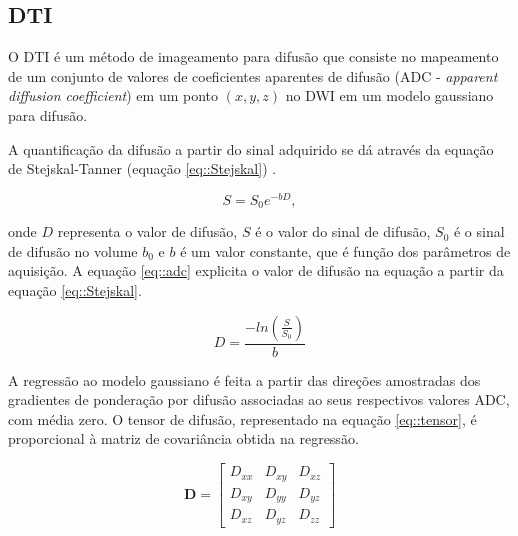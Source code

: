 \documentclass[
    12pt,                %
    oneside,            %
    a4paper,            %
    english,            %
    french,                %
    spanish,            %
    brazil                %
    ]{abntex2}
\begin{document}
\pagebreak
\subsection{DTI}
O DTI é um método de imageamento para difusão que consiste no mapeamento de um conjunto de valores de coeficientes aparentes de difusão (ADC - \textit{apparent diffusion coefficient}) em um ponto $(x, y, z)$ no DWI em um modelo gaussiano para difusão. 

A quantificação da difusão a partir do sinal adquirido se dá através da equação de Stejskal-Tanner (equação \ref{eq::Stejskal}) \cite{DTI_Handbook}.

\begin{equation}
    S = S_0 e^{-bD},
    \label{eq::Stejskal}
\end{equation}

onde $D$ representa o valor de difusão, $S$ é o valor do sinal de difusão, $S_0$ é o sinal de difusão no volume $b_0$ e $b$ é um valor constante, que é função dos parâmetros de aquisição. A equação \ref{eq::adc} explicita o valor de difusão na equação a partir da equação \ref{eq::Stejskal}.

\begin{equation}
\label{eq::adc}
    D = \frac{-ln(\frac{S}{S_0})}{b}
\end{equation}

A regressão ao modelo gaussiano é feita a partir das direções amostradas dos gradientes de ponderação por difusão associadas ao seus respectivos valores ADC, com média zero. O tensor de difusão, representado na equação \ref{eq::tensor}, é proporcional à matriz de covariância obtida na regressão.

\begin{equation}
\label{eq::tensor}
\mathbf{D} = 
\begin{bmatrix}
D_{xx} & D_{xy} & D_{xz} \\ 
D_{xy} & D_{yy} & D_{yz} \\ 
D_{xz} & D_{yz} & D_{zz}  
\end{bmatrix}
\end{equation}
\end{document}
